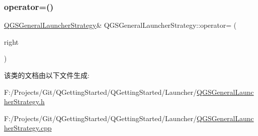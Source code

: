 \mbox{\label{class_q_g_s_general_launcher_strategy_a9bbe96ddfc22ca3d838d838fac810b5d}} 
\subsubsection{\texorpdfstring{operator=()}{operator=()}\hspace{0.1cm}{\footnotesize\ttfamily [2/2]}}
{\footnotesize\ttfamily \mbox{\hyperlink{class_q_g_s_general_launcher_strategy}{Q\+G\+S\+General\+Launcher\+Strategy}}\& Q\+G\+S\+General\+Launcher\+Strategy\+::operator= (\begin{DoxyParamCaption}\item[{\mbox{\hyperlink{class_q_g_s_general_launcher_strategy}{Q\+G\+S\+General\+Launcher\+Strategy}} \&\&}]{right }\end{DoxyParamCaption})\hspace{0.3cm}{\ttfamily [delete]}}



该类的文档由以下文件生成\+:\begin{DoxyCompactItemize}
\item 
F\+:/\+Projects/\+Git/\+Q\+Getting\+Started/\+Q\+Getting\+Started/\+Launcher/\mbox{\hyperlink{_q_g_s_general_launcher_strategy_8h}{Q\+G\+S\+General\+Launcher\+Strategy.\+h}}\item 
F\+:/\+Projects/\+Git/\+Q\+Getting\+Started/\+Q\+Getting\+Started/\+Launcher/\mbox{\hyperlink{_q_g_s_general_launcher_strategy_8cpp}{Q\+G\+S\+General\+Launcher\+Strategy.\+cpp}}\end{DoxyCompactItemize}
